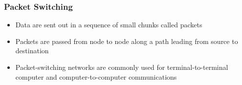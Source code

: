\documentclass[pdflatex,compress]{beamer}
\begin{document}
\begin{frame}
	\frametitle{Packet Switching}
	\begin{itemize}
		\item  Data are sent out in a sequence of small chunks called packets
		\item Packets are passed from node to node along a path leading from source to destination
		\item Packet-switching networks are commonly used for terminal-to-terminal computer and computer-to-computer communications
	\end{itemize}
\end{frame}
\end{document}
